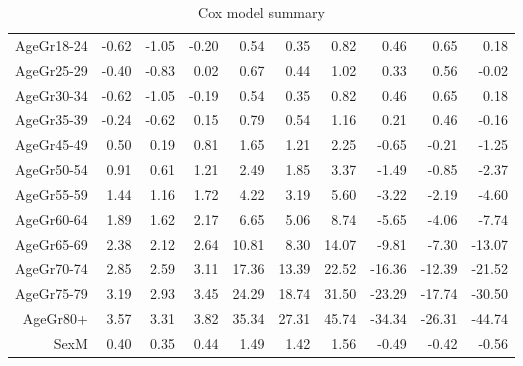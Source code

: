 \begin{table}[ht]
\begin{tabular}{rrrrrrrrrr}
  AgeGr18-24 & -0.62 & -1.05 & -0.20 & 0.54 & 0.35 & 0.82 & 0.46 & 0.65 & 0.18 \\ 
  AgeGr25-29 & -0.40 & -0.83 & 0.02 & 0.67 & 0.44 & 1.02 & 0.33 & 0.56 & -0.02 \\ 
  AgeGr30-34 & -0.62 & -1.05 & -0.19 & 0.54 & 0.35 & 0.82 & 0.46 & 0.65 & 0.18 \\ 
  AgeGr35-39 & -0.24 & -0.62 & 0.15 & 0.79 & 0.54 & 1.16 & 0.21 & 0.46 & -0.16 \\ 
  AgeGr45-49 & 0.50 & 0.19 & 0.81 & 1.65 & 1.21 & 2.25 & -0.65 & -0.21 & -1.25 \\ 
  AgeGr50-54 & 0.91 & 0.61 & 1.21 & 2.49 & 1.85 & 3.37 & -1.49 & -0.85 & -2.37 \\ 
  AgeGr55-59 & 1.44 & 1.16 & 1.72 & 4.22 & 3.19 & 5.60 & -3.22 & -2.19 & -4.60 \\ 
  AgeGr60-64 & 1.89 & 1.62 & 2.17 & 6.65 & 5.06 & 8.74 & -5.65 & -4.06 & -7.74 \\ 
  AgeGr65-69 & 2.38 & 2.12 & 2.64 & 10.81 & 8.30 & 14.07 & -9.81 & -7.30 & -13.07 \\ 
  AgeGr70-74 & 2.85 & 2.59 & 3.11 & 17.36 & 13.39 & 22.52 & -16.36 & -12.39 & -21.52 \\ 
  AgeGr75-79 & 3.19 & 2.93 & 3.45 & 24.29 & 18.74 & 31.50 & -23.29 & -17.74 & -30.50 \\ 
  AgeGr80+ & 3.57 & 3.31 & 3.82 & 35.34 & 27.31 & 45.74 & -34.34 & -26.31 & -44.74 \\ 
  SexM & 0.40 & 0.35 & 0.44 & 1.49 & 1.42 & 1.56 & -0.49 & -0.42 & -0.56 \\ 
   \hline
\end{tabular}
\caption{Cox model summary} 
\end{table}
